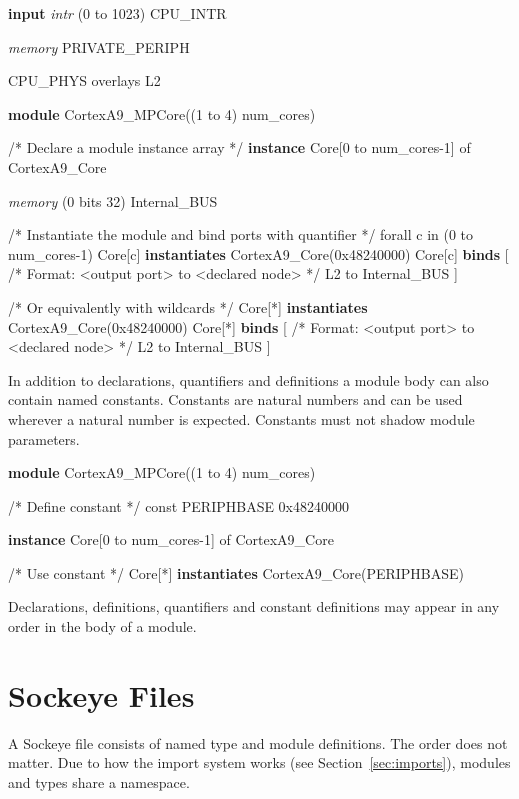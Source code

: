 \documentclass[a4paper,11pt,twoside]{report}
\begin{document}
{{{\begin{example}
{    \textbf{input} \textit{intr} (0 to 1023) CPU_INTR

    \textit{memory} PRIVATE_PERIPH

    CPU_PHYS overlays L2
  }

  \textbf{module} CortexA9_MPCore((1 to 4) num_cores) {
    /* Declare a module instance array */
    \textbf{instance} Core[0 to num_cores-1] of CortexA9_Core

    \textit{memory} (0 bits 32) Internal_BUS

    /* Instantiate the module and bind ports with quantifier */
    forall c in (0 to num_cores-1) {
      Core[c] \textbf{instantiates} CortexA9_Core(0x48240000)
      Core[c] \textbf{binds} [
        /* Format: <output port> to <declared node> */
        L2 to Internal_BUS
      ]
    }

    /* Or equivalently with wildcards */
    Core[*] \textbf{instantiates} CortexA9_Core(0x48240000)
    Core[*] \textbf{binds} [
      /* Format: <output port> to <declared node> */
      L2 to Internal_BUS
    ]
  }
\end{example}


In addition to declarations, quantifiers and definitions a module body can also contain named constants.
Constants are natural numbers and can be used wherever a natural number is expected.
Constants must not shadow module parameters.
\begin{example}
  \textbf{module} CortexA9_MPCore((1 to 4) num_cores) {

    /* Define constant */
    const PERIPHBASE 0x48240000

    \textbf{instance} Core[0 to num_cores-1] of CortexA9_Core

    /* Use constant */
    Core[*] \textbf{instantiates} CortexA9_Core(PERIPHBASE)
  }
\end{example}

Declarations, definitions, quantifiers and constant definitions may appear in any order in the body of a module.

\section{Sockeye Files}
A Sockeye file consists of named type and module definitions.
The order does not matter.
Due to how the import system works (see Section~\ref{sec:imports}), modules and types share a namespace.

}}}
\end{document}
